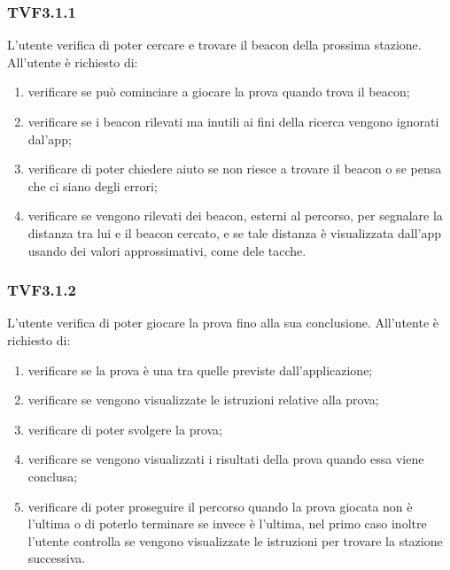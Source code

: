 		\subsubsection{TVF3.1.1}
			L'utente verifica di poter cercare e trovare il beacon della prossima stazione.
			All'utente è richiesto di:
			\begin{enumerate}
				\item verificare se può cominciare a giocare la prova quando trova il beacon;
				\item verificare se i beacon rilevati ma inutili ai fini della ricerca vengono ignorati dal'app;
				\item verificare di poter chiedere aiuto se non riesce a trovare il beacon o se pensa che ci siano degli errori;
				\item verificare se vengono rilevati dei beacon, esterni al percorso, per segnalare la distanza tra lui e il beacon cercato, e se tale distanza è visualizzata dall'app usando dei valori approssimativi, come dele tacche.
			\end{enumerate}
		\subsubsection{TVF3.1.2}
			L'utente verifica di poter giocare la prova fino alla sua conclusione.
			All'utente è richiesto di:
			\begin{enumerate}
				\item verificare se la prova è una tra quelle previste dall'applicazione;
				\item verificare se vengono visualizzate le istruzioni relative alla prova;
				\item verificare di poter svolgere la prova;
				\item verificare se vengono visualizzati i risultati della prova quando essa viene conclusa;
				\item verificare di poter proseguire il percorso quando la prova giocata non è l'ultima o di poterlo terminare se invece è l'ultima, nel primo caso inoltre l'utente controlla se vengono visualizzate le istruzioni per trovare la stazione successiva.
			\end{enumerate}
